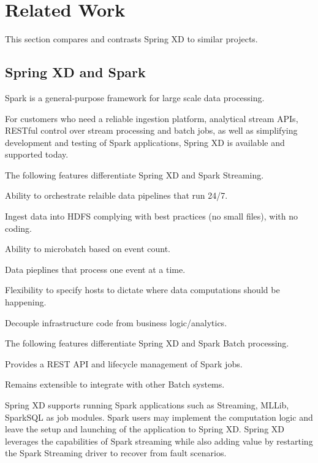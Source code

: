 \section{Related Work}
This section compares and contrasts Spring XD to similar projects.

\subsection{Spring XD and Spark}
Spark\cite{spark} is a general-purpose framework for large scale data processing.

For customers who need a reliable ingestion platform, analytical stream APIs, RESTful control over stream processing and batch jobs, as well as simplifying development and testing of Spark applications, Spring XD is available and supported today.

The following features differentiate Spring XD and Spark Streaming.

\begin{itemize*}
\item Ability to orchestrate relaible data pipelines that run 24/7.
\item Ingest data into HDFS complying with best practices (no small files), with no coding.
\item Ability to microbatch based on event count.
\item Data pieplines that process one event at a time.
\item Flexibility to specify hosts to dictate where data computations should be happening.
\item Decouple infrastructure code from business logic\slash analytics.
\end{itemize*}

The following features differentiate Spring XD and Spark Batch processing.

\begin{itemize*}
\item Provides a REST API and lifecycle management of Spark jobs.
\item Remains extensible to integrate with other Batch systems.
\end{itemize*}

Spring XD supports running Spark applications such as Streaming, MLLib, SparkSQL as job modules.
Spark users may implement the computation logic and leave the setup and launching of the
application to Spring XD. Spring XD leverages the capabilities of Spark streaming while
also adding value by restarting the Spark Streaming driver to recover from fault scenarios.

